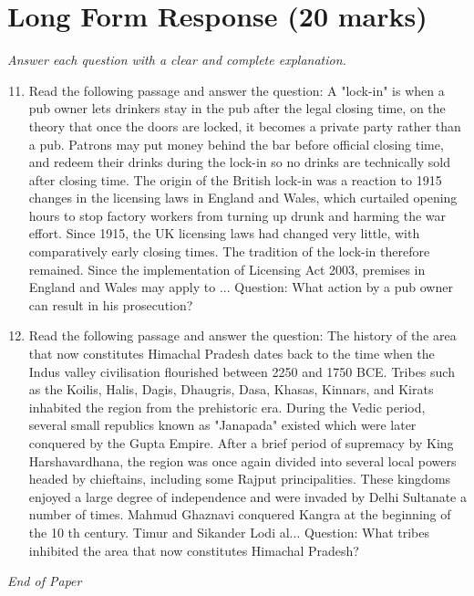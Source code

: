 \documentclass[12pt]{article}
\begin{document}
\section*{Long Form Response (20 marks)}
\textit{Answer each question with a clear and complete explanation.}
\begin{enumerate}[label=\arabic*.]
\setcounter{enumi}{10}
\item Read the following passage and answer the question: A "lock-in" is when a pub owner lets drinkers stay in the pub after the legal closing time, on the theory that once the doors are locked, it becomes a private party rather than a pub. Patrons may put money behind the bar before official closing time, and redeem their drinks during the lock-in so no drinks are technically sold after closing time. The origin of the British lock-in was a reaction to 1915 changes in the licensing laws in England and Wales, which curtailed opening hours to stop factory workers from turning up drunk and harming the war effort. Since 1915, the UK licensing laws had changed very little, with comparatively early closing times. The tradition of the lock-in therefore remained. Since the implementation of Licensing Act 2003, premises in England and Wales may apply to ... Question: What action by a pub owner can result in his prosecution?
\item Read the following passage and answer the question: The history of the area that now constitutes Himachal Pradesh dates back to the time when the Indus valley civilisation flourished between 2250 and 1750 BCE. Tribes such as the Koilis, Halis, Dagis, Dhaugris, Dasa, Khasas, Kinnars, and Kirats inhabited the region from the prehistoric era. During the Vedic period, several small republics known as "Janapada" existed which were later conquered by the Gupta Empire. After a brief period of supremacy by King Harshavardhana, the region was once again divided into several local powers headed by chieftains, including some Rajput principalities. These kingdoms enjoyed a large degree of independence and were invaded by Delhi Sultanate a number of times. Mahmud Ghaznavi conquered Kangra at the beginning of the 10 th century. Timur and Sikander Lodi al... Question: What tribes inhibited the area that now constitutes Himachal Pradesh?
\end{enumerate}

\vfill
\noindent\textit{End of Paper}
\end{document}
